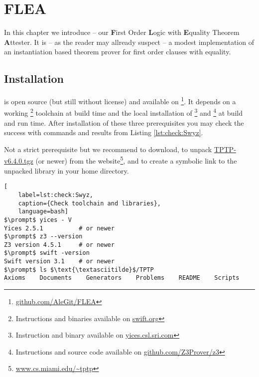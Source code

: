 
\chapter{FLEA}



In this chapter we introduce \FLEA --
our \textbf{F}irst Order \textbf{L}ogic with \textbf{E}quality Theorem \textbf{A}ttester. 
It is 
-- as the reader may allready suspect --
a modest implementation of an instantiation based theorem prover for first order clauses with equality.


\section{Installation}

\FLEA is open source (but still without license) and available on \GitHub\footnote{
	\href{https://github.com/AleGit/FLEA}{github.com/AleGit/FLEA}
}. It depends on a working \Swift\footnote{
	Instructions and binaries available on \href{https://swift.org}{swift.org}
} toolchain at build time and the local installation of 
\Yices\footnote{
	Instruction and binary available on \href{http://yices.csl.sri.com}{yices.csl.sri.com}
}
and \Ziii\footnote{
	Instructions and source code available on \href{https://github.com/Z3Prover/z3}{github.com/Z3Prover/z3}
} at build and run time. After installation of these three prerequisites you may check the success with commands and results from Listing \ref{lst:check:Swyz}. 

Not a strict prerequisite but we recommend to download, to unpack \href{http://www.cs.miami.edu/~tptp/TPTP/Distribution/TPTP-v6.4.0.tgz}{TPTP-v6.4.0.tgz} (or newer)
from the \TPTP website\footnote{
	\href{http://www.cs.miami.edu/~tptp/}{www.cs.miami.edu/\textasciitilde tptp}
}, and to create a symbolic link to the unpacked library in your home directory.
\begin{lstlisting}[
	label=lst:check:Swyz,
	caption={Check toolchain and libraries},
	language=bash]
$\prompt$ yices - V
Yices 2.5.1          # or newer
$\prompt$ z3 --version
Z3 version 4.5.1     # or newer
$\prompt$ swift -version
Swift version 3.1    # or newer
$\prompt$ ls $\text{\textasciitilde}$/TPTP
Axioms    Documents    Generators    Problems    README    Scripts
\end{lstlisting}

